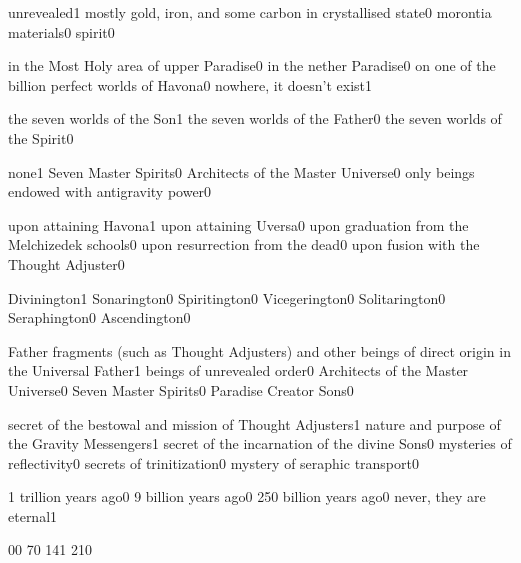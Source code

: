 {unrevealed}{1}
{mostly gold, iron, and some carbon in crystallised state}{0}
{morontia materials}{0}
{spirit}{0}
\qstop

{in the Most Holy area of upper Paradise}{0}
{in the nether Paradise}{0}
{on one of the billion perfect worlds of Havona}{0}
{nowhere, it doesn't exist}{1}
\qstop

{the seven worlds of the Son}{1}
{the seven worlds of the Father}{0}
{the seven worlds of the Spirit}{0}
\qstop

{none}{1}
{Seven Master Spirits}{0}
{Architects of the Master Universe}{0}
{only beings endowed with antigravity power}{0}
\qstop

{upon attaining Havona}{1}
{upon attaining Uversa}{0}
{upon graduation from the Melchizedek schools}{0}
{upon resurrection from the dead}{0}
{upon fusion with the Thought Adjuster}{0}
\qstop

{Divinington}{1}
{Sonarington}{0}
{Spiritington}{0}
{Vicegerington}{0}
{Solitarington}{0}
{Seraphington}{0}
{Ascendington}{0}
\qstop

{Father fragments (such as Thought Adjusters) and other beings of direct origin in the Universal Father}{1}
{beings of unrevealed order}{0}
{Architects of the Master Universe}{0}
{Seven Master Spirits}{0}
{Paradise Creator Sons}{0}
\qstop

{secret of the bestowal and mission of Thought Adjusters}{1}
{nature and purpose of the Gravity Messengers}{1}
{secret of the incarnation of the divine Sons}{0}
{mysteries of reflectivity}{0}
{secrets of trinitization}{0}
{mystery of seraphic transport}{0}
\qstop

{1 trillion years ago}{0}
{9 billion years ago}{0}
{250 billion years ago}{0}
{never, they are eternal}{1}
\qstop

{0}{0}
{7}{0}
{14}{1}
{21}{0}
\qstop

